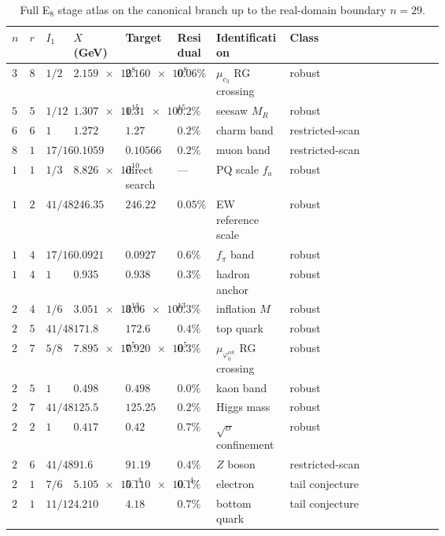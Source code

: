 \documentclass[11pt,a4paper]{article}
\theoremstyle{definition}
\theoremstyle{remark}
\newcommand{\cthree}{c_3}
\newcommand{\phiz}{\varphi_0^{\mathrm{ret}}}
\begin{document}
\begin{table}[H]
\centering
\scriptsize
\setlength{\tabcolsep}{2pt}
\begin{tabularx}{\linewidth}{@{}>{\centering\arraybackslash}p{0.035\linewidth}>{\centering\arraybackslash}p{0.035\linewidth}>{\raggedright\arraybackslash}p{0.065\linewidth}>{\raggedleft\arraybackslash}p{0.12\linewidth}>{\raggedleft\arraybackslash}p{0.12\linewidth}>{\raggedright\arraybackslash}p{0.09\linewidth}>{\raggedright\arraybackslash}p{0.17\linewidth}Y@{}}
\toprule
$n$ & $r$ & $I_1$ & $X$ (GeV) & Target & Residual & Identification & Class \\
\midrule
$3$ & $8$ & $1/2$ & $\num{2.159e8}$ & $\num{2.160e8}$ & $0.06\%$ & $\mu_{\cthree}$ RG crossing & robust \\
$5$ & $5$ & $1/12$ & $\num{1.307e15}$ & $\num{1.31e15}$ & $0.2\%$ & seesaw $M_R$ & robust \\
$6$ & $6$ & $1$ & $\num{1.272}$ & $\num{1.27}$ & $0.2\%$ & charm band & restricted-scan \\
$8$ & $1$ & $17/16$ & $\num{0.1059}$ & $\num{0.10566}$ & $0.2\%$ & muon band & restricted-scan \\
$10$ & $1$ & $1/3$ & $\num{8.826e10}$ & direct search & --- & PQ scale $f_a$ & robust \\
$12$ & $2$ & $41/48$ & $\num{246.35}$ & $\num{246.22}$ & $0.05\%$ & EW reference scale & robust \\
$14$ & $4$ & $17/16$ & $\num{0.0921}$ & $\num{0.0927}$ & $0.6\%$ & $f_\pi$ band & robust \\
$15$ & $4$ & $1$ & $\num{0.935}$ & $\num{0.938}$ & $0.3\%$ & hadron anchor & robust \\
$21$ & $4$ & $1/6$ & $\num{3.051e13}$ & $\num{3.06e13}$ & $0.3\%$ & inflation $M$ & robust \\
$21$ & $5$ & $41/48$ & $\num{171.8}$ & $\num{172.6}$ & $0.4\%$ & top quark & robust \\
$24$ & $7$ & $5/8$ & $\num{7.895e5}$ & $\num{7.920e5}$ & $0.3\%$ & $\mu_{\phiz}$ RG crossing & robust \\
$25$ & $5$ & $1$ & $\num{0.498}$ & $\num{0.498}$ & $0.0\%$ & kaon band & robust \\
$25$ & $7$ & $41/48$ & $\num{125.5}$ & $\num{125.25}$ & $0.2\%$ & Higgs mass & robust \\
$26$ & $2$ & $1$ & $\num{0.417}$ & $\num{0.42}$ & $0.7\%$ & $\sqrt{\sigma}$ confinement & robust \\
$27$ & $6$ & $41/48$ & $\num{91.6}$ & $\num{91.19}$ & $0.4\%$ & $Z$ boson & restricted-scan \\
$28$ & $1$ & $7/6$ & $\num{5.105e-4}$ & $\num{5.110e-4}$ & $0.1\%$ & electron & tail conjecture \\
$29$ & $1$ & $11/12$ & $\num{4.210}$ & $\num{4.18}$ & $0.7\%$ & bottom quark & tail conjecture \\
\bottomrule
\end{tabularx}
\caption{Full E$_8$ stage atlas on the canonical branch up to the real-domain boundary $n=29$.}
\label{tab:e8-full-atlas}
\end{table}
\end{document}
